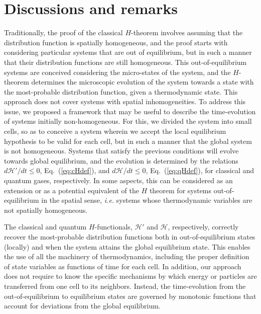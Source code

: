 
\color{red}
\section{Discussions and remarks}\label{sec:disscussion}

Traditionally, the proof of the classical $H$-theorem involves assuming that the
distribution function is spatially homogeneous, and the proof starts with
considering particular systems that are out of equilibrium, but in such a manner
that their distribution functions are still homogeneous. This out-of-equilibrium systems
are conceived considering the micro-states of the system, and the $H$-theorem determines
the microscopic evolution of the system towards a state with the most-probable distribution function,
given a thermodynamic state. 
This approach does not cover systems with spatial inhomogeneities.
To address this issue, we
proposed a framework that may be useful to describe the time-evolution of systems
initially non-homogeneous. For this, we divided the
system into small cells, so as to conceive a system wherein we accept the local equilibrium
hypothesis to be valid for each cell, but in such a manner that the global system is not homogeneous. Systems
that satisfy the previous conditions will evolve towards global equilibrium, and the evolution is
determined by the relations $d\mathcal{H}'/dt\leq0$, Eq.~(\ref{eq:cHdef}),
and $d\mathcal{H}/dt\leq0$, Eq.~(\ref{eq:qHdef}), for classical and quantum gases, respectively.
In some aspects, this can be considered as an extension or as a potential equivalent of the $H$ theorem
for systems out-of-equilibrium in the spatial sense, \textit{i.e.} systems whose thermodynamic
variables are not spatially homogeneous.

The classical and quantum $H$-functionals, $\mathcal{H}'$ and $\mathcal{H}$, respectively,
correctly recover the most-probable distribution
functions both in out-of-equilibrium states (locally) and when the system attains the global
equilibrium state. This enables the use of all the machinery of thermodynamics, including the
proper definition of state variables as functions of time for each cell. In addition, our approach
does not require to know the specific mechanisms by which energy or particles are transferred from one
cell to its neighbors. Instead, the time-evolution from the out-of-equilibrium to equilibrium states are
governed by monotonic functions that account for deviations from the global equilibrium.

